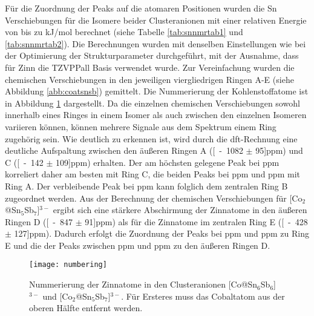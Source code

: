 Für die Zuordnung der Peaks auf die atomaren Positionen wurden die Sn Verschiebungen für die Isomere beider Clusteranionen mit einer relativen Energie von bis zu \unit[10]{kJ/mol} berechnet (siehe Tabelle \ref{tab:snnmrtab1} und \ref{tab:snnmrtab2}). Die Berechnungen wurden mit denselben Einstellungen wie bei der Optimierung der Strukturparameter durchgeführt, mit der Ausnahme, dass für Zinn die TZVPPall Basis\supercite{ahlrichs2000contracted} verwendet wurde. Zur Vereinfachung wurden die chemischen Verschiebungen in den jeweiligen viergliedrigen Ringen A-E (siehe Abbildung \ref{abb:coatsnsb}) gemittelt. Die Nummerierung der Kohlenstoffatome ist in Abbildung \ref{abb:numbering} dargestellt.  Da die einzelnen chemischen Verschiebungen sowohl innerhalb eines Ringes in einem Isomer als auch zwischen den einzelnen Isomeren variieren können, können mehrere Signale aus dem Spektrum einem Ring zugehörig sein. Wie deutlich zu erkennen ist, wird durch die \ac{dft}-Rechnung eine deutliche Aufspaltung zwischen den äußeren Ringen A (\unit[-1082 $\pm$ 95]{ppm}) und C (\unit[-142 $\pm$ 109]{ppm}) erhalten. Der am höchsten gelegene Peak bei \unit[-119]{ppm} korreliert daher am besten mit Ring C, die beiden Peaks bei \unit[-970]{ppm} und \unit[-1018]{ppm} mit Ring A. Der verbleibende Peak bei \unit[-731]{ppm} kann folglich dem zentralen Ring B zugeordnet werden. Aus der Berechnung der chemischen Verschiebungen für [Co$_2$@Sn$_5$Sb$_7$]$^{3-}$ ergibt sich eine stärkere Abschirmung der Zinnatome in den äußeren Ringen D (\unit[-847 $\pm$ 91]{ppm}) als für die Zinnatome im zentralen Ring E (\unit[-428 $\pm$ 127]{ppm}). Dadurch erfolgt die Zuordnung der Peaks bei \unit[-634]{ppm} und \unit[-676]{ppm} zu Ring E und die der Peaks zwischen \unit[-849]{ppm} und \unit[-890]{ppm} zu den äußeren Ringen D. 
\vspace{20pt}
\begin{figure}[ht!]
	\centering
	\texttt{[image: numbering]}
	\captionsetup{figurewithin = chapter}
	\captionsetup{font=small, labelfont=bf}\caption[Nummerierung der Zinnatome in {[Co@Sn$_6$Sb$_6$]$^{3-}$} und {[Co$_2$@Sn$_5$Sb$_7$]$^{3-}$} ]{Nummerierung der Zinnatome in den Clusteranionen [Co@Sn$_6$Sb$_6$]$^{3-}$ und [Co$_2$@Sn$_5$Sb$_7$]$^{3-}$. Für Ersteres muss das Cobaltatom aus der oberen Hälfte entfernt werden.}
\label{abb:numbering}
\end{figure}
\vfill
\newpage

